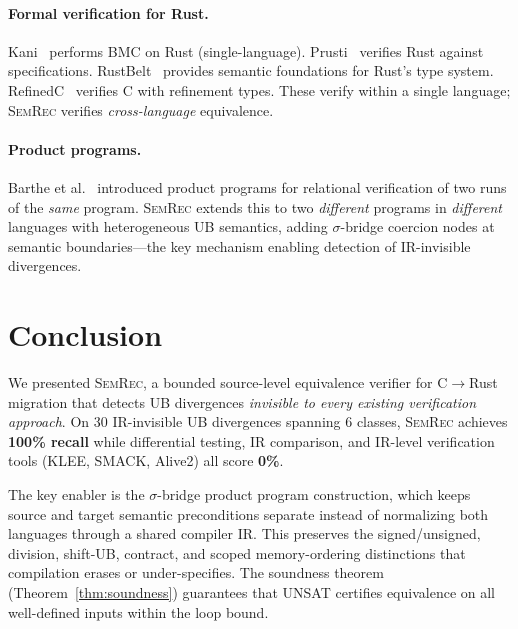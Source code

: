 \documentclass[10pt,a4paper]{article}
\begin{document}
\paragraph{Formal verification for Rust.}
Kani~\cite{kani2022} performs BMC on Rust (single-language).
Prusti~\cite{astrauskas2022prusti} verifies Rust against
specifications.  RustBelt~\cite{jung2017rustbelt} provides semantic
foundations for Rust's type system.
RefinedC~\cite{sammler2021refinedc} verifies C with refinement types.
These verify within a single language; \textsc{SemRec} verifies
\emph{cross-language} equivalence.

\paragraph{Product programs.}
Barthe et al.~\cite{barthe2011product} introduced product programs
for relational verification of two runs of the \emph{same} program.
\textsc{SemRec} extends this to two \emph{different} programs in
\emph{different} languages with heterogeneous UB semantics,
adding $\sigma$-bridge coercion nodes at semantic boundaries---the
key mechanism enabling detection of IR-invisible divergences.


\section{Conclusion}\label{sec:conclusion}

We presented \textsc{SemRec}, a bounded source-level equivalence
verifier for C$\to$Rust migration that detects UB divergences
\emph{invisible to every existing verification approach}.  On 30
IR-invisible UB divergences spanning 6 classes, \textsc{SemRec}
achieves \textbf{100\% recall} while differential testing, IR
comparison, and IR-level verification tools (KLEE, SMACK, Alive2)
all score \textbf{0\%}.

The key enabler is the $\sigma$-bridge product program construction,
which keeps source and target semantic preconditions separate instead of
normalizing both languages through a shared compiler IR.  This preserves the
signed/unsigned, division, shift-UB, contract, and scoped memory-ordering
distinctions that compilation erases or under-specifies.  The soundness theorem
(Theorem~\ref{thm:soundness})
guarantees that UNSAT certifies equivalence on all well-defined
inputs within the loop bound.
\end{document}
